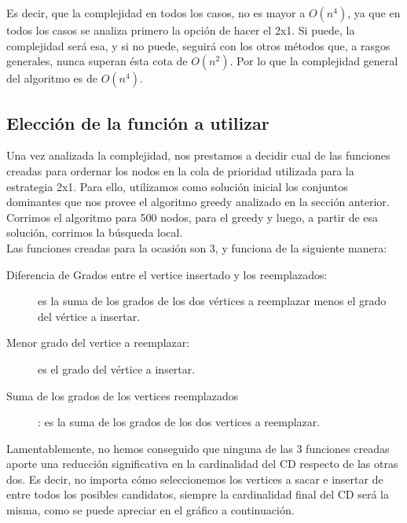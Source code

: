  Es decir, que la complejidad en todos los casos, no es mayor a $O(n^4)$, ya que en todos los casos se analiza primero la opción de hacer el 2x1. Si puede, la complejidad será esa, y si no puede, seguirá con los otros métodos que, a rasgos generales, nunca superan ésta cota de $O(n^2)$. Por lo que la complejidad general del algoritmo es de \textbf{$O(n^4)$}.
 
 \subsection{Elección de la función a utilizar}
 Una vez analizada la complejidad, nos prestamos a decidir cual de las funciones creadas para ordernar los nodos en la cola de prioridad utilizada para la estrategia 2x1. Para ello, utilizamos como solución inicial los conjuntos dominantes que nos provee el algoritmo greedy analizado en la sección anterior. Corrimos el algoritmo para 500 nodos, para el greedy y luego, a partir de esa solución, corrimos la búsqueda local. \\
Las funciones creadas para la ocasión son 3, y funciona de la siguiente manera: 
\begin{description}
\item[Diferencia de Grados entre el vertice insertado y los reemplazados:] es la suma de los grados de los dos vértices a reemplazar menos el grado del vértice a insertar.
\item[Menor grado del vertice a reemplazar:] es el grado del vértice a insertar.
\item[Suma de los grados de los vertices reemplazados]: es la suma de los grados de los dos vertices a reemplazar.
\end{description}

Lamentablemente, no hemos conseguido que ninguna de las 3 funciones creadas aporte una reducción significativa en la cardinalidad del CD respecto de las otras dos. Es decir, no importa cómo seleccionemos los vertices a sacar e insertar de entre todos los posibles candidatos, siempre la cardinalidad final del CD será la misma, como se puede apreciar en el gráfico a continuación. \\

